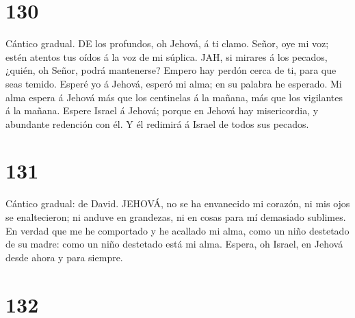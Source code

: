 \hypertarget{section-129}{%
\section{130}\label{section-129}}

 Cántico gradual. DE los profundos, oh Jehová, á ti clamo.
 Señor, oye mi voz; estén atentos tus oídos á la voz de mi
súplica.  JAH, si mirares á los pecados, ¿quién, oh Señor,
podrá mantenerse?  Empero hay perdón cerca de ti, para que
seas temido.  Esperé yo á Jehová, esperó mi alma; en su
palabra he esperado.  Mi alma espera á Jehová más que los
centinelas á la mañana, más que los vigilantes á la mañana. 
Espere Israel á Jehová; porque en Jehová hay misericordia, y abundante
redención con él.  Y él redimirá á Israel de todos sus
pecados.

\hypertarget{section-130}{%
\section{131}\label{section-130}}

 Cántico gradual: de David. JEHOVÁ, no se ha envanecido mi
corazón, ni mis ojos se enaltecieron; ni anduve en grandezas, ni en
cosas para mí demasiado sublimes.  En verdad que me he
comportado y he acallado mi alma, como un niño destetado de su madre:
como un niño destetado está mi alma.  Espera, oh Israel, en
Jehová desde ahora y para siempre.

\hypertarget{section-131}{%
\section{132}\label{section-131}}

